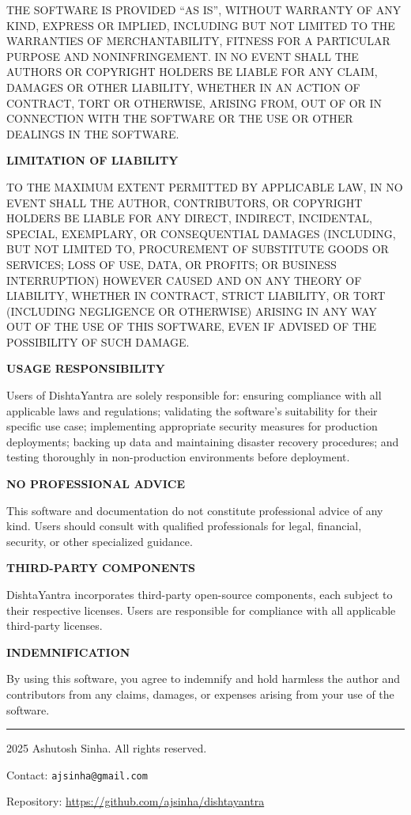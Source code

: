 \documentclass[11pt,a4paper]{article}
\begin{document}
THE SOFTWARE IS PROVIDED ``AS IS'', WITHOUT WARRANTY OF ANY KIND, EXPRESS OR IMPLIED, INCLUDING BUT NOT LIMITED TO THE WARRANTIES OF MERCHANTABILITY, FITNESS FOR A PARTICULAR PURPOSE AND NONINFRINGEMENT. IN NO EVENT SHALL THE AUTHORS OR COPYRIGHT HOLDERS BE LIABLE FOR ANY CLAIM, DAMAGES OR OTHER LIABILITY, WHETHER IN AN ACTION OF CONTRACT, TORT OR OTHERWISE, ARISING FROM, OUT OF OR IN CONNECTION WITH THE SOFTWARE OR THE USE OR OTHER DEALINGS IN THE SOFTWARE.

\textbf{LIMITATION OF LIABILITY}

TO THE MAXIMUM EXTENT PERMITTED BY APPLICABLE LAW, IN NO EVENT SHALL THE AUTHOR, CONTRIBUTORS, OR COPYRIGHT HOLDERS BE LIABLE FOR ANY DIRECT, INDIRECT, INCIDENTAL, SPECIAL, EXEMPLARY, OR CONSEQUENTIAL DAMAGES (INCLUDING, BUT NOT LIMITED TO, PROCUREMENT OF SUBSTITUTE GOODS OR SERVICES; LOSS OF USE, DATA, OR PROFITS; OR BUSINESS INTERRUPTION) HOWEVER CAUSED AND ON ANY THEORY OF LIABILITY, WHETHER IN CONTRACT, STRICT LIABILITY, OR TORT (INCLUDING NEGLIGENCE OR OTHERWISE) ARISING IN ANY WAY OUT OF THE USE OF THIS SOFTWARE, EVEN IF ADVISED OF THE POSSIBILITY OF SUCH DAMAGE.

\textbf{USAGE RESPONSIBILITY}

Users of DishtaYantra are solely responsible for: ensuring compliance with all applicable laws and regulations; validating the software's suitability for their specific use case; implementing appropriate security measures for production deployments; backing up data and maintaining disaster recovery procedures; and testing thoroughly in non-production environments before deployment.

\textbf{NO PROFESSIONAL ADVICE}

This software and documentation do not constitute professional advice of any kind. Users should consult with qualified professionals for legal, financial, security, or other specialized guidance.

\textbf{THIRD-PARTY COMPONENTS}

DishtaYantra incorporates third-party open-source components, each subject to their respective licenses. Users are responsible for compliance with all applicable third-party licenses.

\textbf{INDEMNIFICATION}

By using this software, you agree to indemnify and hold harmless the author and contributors from any claims, damages, or expenses arising from your use of the software.

\vspace{2em}
\hrule
\vspace{1em}
\noindent\textcopyright{} 2025 Ashutosh Sinha. All rights reserved.

\noindent Contact: \texttt{ajsinha@gmail.com}

\noindent Repository: \url{https://github.com/ajsinha/dishtayantra}
\end{document}

